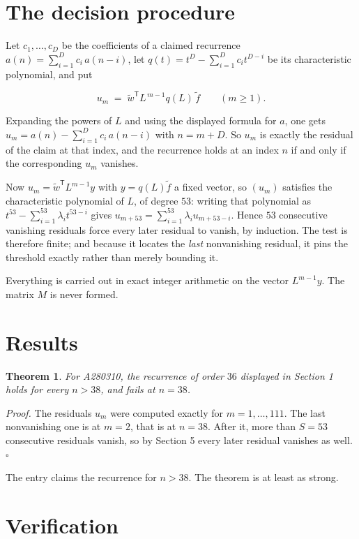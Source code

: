 \documentclass[11pt]{article}
\newtheorem{theorem}{Theorem}
\theoremstyle{definition}
\begin{document}
\section{The decision procedure}

Let $c_1,\dots,c_D$ be the coefficients of a claimed recurrence $a(n) = \sum_{i=1}^{D} c_i\,a(n-i)$, let $q(t) = t^{D} - \sum_{i=1}^{D} c_i t^{D-i}$ be its characteristic polynomial, and put

\[u_m \;=\; \tilde w^{\mathsf T} L^{\,m-1} q(L)\,\tilde f \qquad (m \ge 1).\]

Expanding the powers of $L$ and using the displayed formula for $a$, one gets $u_m = a(n) - \sum_{i=1}^{D} c_i\,a(n-i)$ with $n = m + D$. So $u_m$ is exactly the residual of the claim at that index, and the recurrence holds at an index $n$ if and only if the corresponding $u_m$ vanishes.

Now $u_m = \tilde w^{\mathsf T} L^{m-1} y$ with $y = q(L)\tilde f$ a fixed vector, so $(u_m)$ satisfies the characteristic polynomial of $L$, of degree $53$: writing that polynomial as $t^{53} - \sum_{i=1}^{53} \lambda_i t^{53-i}$ gives $u_{m+53} = \sum_{i=1}^{53} \lambda_i u_{m+53-i}$. Hence $53$ consecutive vanishing residuals force every later residual to vanish, by induction. The test is therefore finite; and because it locates the {\itshape last} nonvanishing residual, it pins the threshold exactly rather than merely bounding it.

Everything is carried out in exact integer arithmetic on the vector $L^{m-1}y$. The matrix $M$ is never formed.

\section{Results}

\begin{theorem} For A280310, the recurrence of order $36$ displayed in Section 1 holds for every $n > 38$, and fails at $n = 38$.\end{theorem}

{\itshape Proof.} The residuals $u_m$ were computed exactly for $m = 1,\dots,111$. The last nonvanishing one is at $m = 2$, that is at $n = 38$. After it, more than $S = 53$ consecutive residuals vanish, so by Section 5 every later residual vanishes as well. $\square$

The entry claims the recurrence for $n > 38$. The theorem is at least as strong.

\section{Verification}
\end{document}
